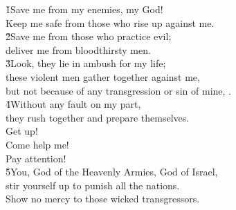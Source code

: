 \begin{poetry}
\poeml \v{1}Save me from my enemies, my God! \\
\poemll    Keep me safe from those who rise up against me. \\
\poeml \v{2}Save me from those who practice evil; \\
\poemll    deliver me from bloodthirsty men. \\
\poeml \v{3}Look, they lie in ambush for my life; \\
\poemll    these violent men gather together against me, \\
\poemlll       but not because of any transgression or sin of mine, . \\
\poeml \v{4}Without any fault on my part, \\
\poemll    they rush together and prepare themselves. \\
\poeml Get up! \\
\poemll    Come help me! \\
\poemlll       Pay attention! \\
\poeml \v{5}You,  God of the Heavenly Armies, God of Israel, \\
\poemll    stir yourself up to punish all the nations. \\
\poemlll       Show no mercy to those wicked transgressors.
\end{poetry}

